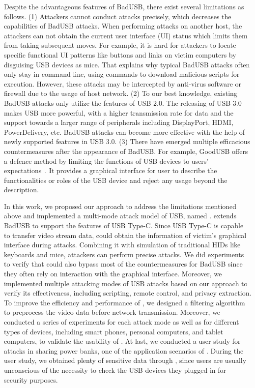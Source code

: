 Despite the advantageous features of BadUSB, there exist several limitations as follows.
(1) Attackers cannot conduct attacks precisely, which decreases the capabilities of BadUSB attacks.
When performing attacks on another host, the attackers can not obtain the current user interface (UI) status which limits them from taking subsequent moves.
For example, it is hard for attackers to locate specific functional UI patterns like buttons and links on victim computers by disguising USB devices as mice.
That explains why typical BadUSB attacks often only stay in command line, using commands to download malicious scripts for execution.
However, these attacks may be intercepted by anti-virus software or firewall due to the usage of host network.
(2) To our best knowledge, existing BadUSB attacks only utilize the features of USB 2.0.
The releasing of USB 3.0 makes USB more powerful, with a higher transmission rate for data and the support towards a larger range of peripherals including DisplayPort, HDMI, PowerDelivery, etc.
BadUSB attacks can become more effective with the help of newly supported features in USB 3.0.
(3) There have emerged multiple efficacious countermeasures after the appearance of BadUSB.
For example, GoodUSB offers a defence method by limiting the functions of USB devices to users' expectations~\cite{tian2015defending}.
It provides a graphical interface for user to describe the functionalities or roles of the USB device and reject any usage beyond the description.

In this work, we proposed our approach to address the limitations mentioned above and implemented a multi-mode attack model of USB, named \tool.
\tool extends BadUSB to support the features of USB Type-C.
Since USB Type-C is capable to transfer video stream data, \tool could obtain the information of victim's graphical interface during attacks.
Combining it with simulation of traditional HIDs like keyboards and mice, attackers can perform precise attacks.
We did experiments to verify that \tool could also bypass most of the countermeasures for BadUSB since they often rely on interaction with the graphical interface.
Moreover, we implemented multiple attacking modes of USB attacks based on our approach to verify its effectiveness, including scripting, remote control, and privacy extraction.
To improve the efficiency and performance of \tool, we designed a filtering algorithm to preprocess the video data before network transmission.
Moreover, we conducted a series of experiments for each attack mode as well as for different types of devices, including smart phones, personal computers, and tablet computers, to validate the usability of \tool.
At last, we conducted a user study for attacks in sharing power banks, one of the application scenarios of \tool.
During the user study, we obtained plenty of sensitive data through \tool, since users are usually unconscious of the necessity to check the USB devices they plugged in for security purposes.

